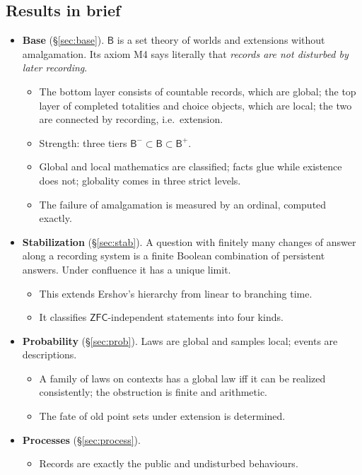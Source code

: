 \documentclass[11pt]{article}
\theoremstyle{definition}
\theoremstyle{remark}
\newcommand{\B}{\mathsf{B}}
\newcommand{\Bm}{\mathsf{B}^{-}}
\newcommand{\Bp}{\mathsf{B}^{+}}
\newcommand{\ZFC}{\mathsf{ZFC}}
\begin{document}
\subsection{Results in brief}
\begin{itemize}
\item \textbf{Base} (\S\ref{sec:base}). $\B$ is a set theory of worlds and extensions without amalgamation. Its axiom M4 says literally that \emph{records are not disturbed by later recording}.
  \begin{itemize}
  \item The bottom layer consists of countable records, which are global; the top layer of completed totalities and choice objects, which are local; the two are connected by recording, i.e.\ extension.
  \item Strength: three tiers $\Bm\subset\B\subset\Bp$.
  \item Global and local mathematics are classified; facts glue while existence does not; globality comes in three strict levels.
  \item The failure of amalgamation is measured by an ordinal, computed exactly.
  \end{itemize}
\item \textbf{Stabilization} (\S\ref{sec:stab}). A question with finitely many changes of answer along a recording system is a finite Boolean combination of persistent answers. Under confluence it has a unique limit.
  \begin{itemize}
  \item This extends Ershov's hierarchy from linear to branching time.
  \item It classifies $\ZFC$-independent statements into four kinds.
  \end{itemize}
\item \textbf{Probability} (\S\ref{sec:prob}). Laws are global and samples local; events are descriptions.
  \begin{itemize}
  \item A family of laws on contexts has a global law iff it can be realized consistently; the obstruction is finite and arithmetic.
  \item The fate of old point sets under extension is determined.
  \end{itemize}
\item \textbf{Processes} (\S\ref{sec:process}).
  \begin{itemize}
  \item Records are exactly the public and undisturbed behaviours.

\end{itemize}
\end{itemize}
\end{document}
